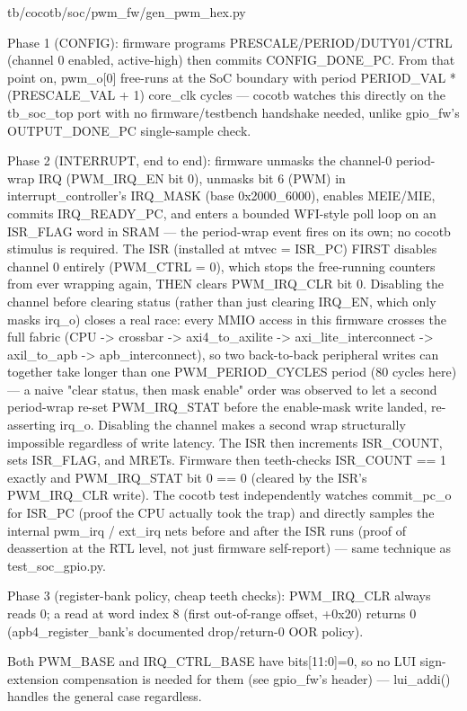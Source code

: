 \begin{relocated}{tb/cocotb/soc/pwm_fw/gen_pwm_hex.py}
\begin{textblock}
Phase 1 (CONFIG): firmware programs PRESCALE/PERIOD/DUTY01/CTRL (channel 0
enabled, active-high) then commits CONFIG_DONE_PC. From that point on,
pwm_o[0] free-runs at the SoC boundary with period
PERIOD_VAL * (PRESCALE_VAL + 1) core_clk cycles — cocotb watches this
directly on the tb_soc_top port with no firmware/testbench handshake
needed, unlike gpio_fw's OUTPUT_DONE_PC single-sample check.

Phase 2 (INTERRUPT, end to end): firmware unmasks the channel-0 period-wrap
IRQ (PWM_IRQ_EN bit 0), unmasks bit 6 (PWM) in interrupt_controller's
IRQ_MASK (base 0x2000_6000), enables MEIE/MIE, commits IRQ_READY_PC, and
enters a bounded WFI-style poll loop on an ISR_FLAG word in SRAM — the
period-wrap event fires on its own; no cocotb stimulus is required. The
ISR (installed at mtvec = ISR_PC) FIRST disables channel 0 entirely
(PWM_CTRL = 0), which stops the free-running counters from ever wrapping
again, THEN clears PWM_IRQ_CLR bit 0. Disabling the channel before
clearing status (rather than just clearing IRQ_EN, which only masks
irq_o) closes a real race: every MMIO access in this firmware crosses the
full fabric (CPU -> crossbar -> axi4_to_axilite -> axi_lite_interconnect
-> axil_to_apb -> apb_interconnect), so two back-to-back peripheral
writes can together take longer than one PWM_PERIOD_CYCLES period
(80 cycles here) — a naive "clear status, then mask enable" order was
observed to let a second period-wrap re-set PWM_IRQ_STAT before the
enable-mask write landed, re-asserting irq_o. Disabling the channel makes
a second wrap structurally impossible regardless of write latency. The
ISR then increments ISR_COUNT, sets ISR_FLAG, and MRETs. Firmware then
teeth-checks ISR_COUNT == 1 exactly and PWM_IRQ_STAT bit 0 == 0 (cleared
by the ISR's PWM_IRQ_CLR write). The cocotb test independently watches
commit_pc_o for ISR_PC (proof the CPU actually took the trap) and
directly samples the internal pwm_irq / ext_irq nets before and after the
ISR runs (proof of deassertion at the RTL level, not just firmware
self-report) — same technique as test_soc_gpio.py.

Phase 3 (register-bank policy, cheap teeth checks): PWM_IRQ_CLR always
reads 0; a read at word index 8 (first out-of-range offset, +0x20) returns
0 (apb4_register_bank's documented drop/return-0 OOR policy).

Both PWM_BASE and IRQ_CTRL_BASE have bits[11:0]=0, so no LUI sign-extension
compensation is needed for them (see gpio_fw's header) — lui_addi() handles
the general case regardless.


\end{textblock}
\end{relocated}
